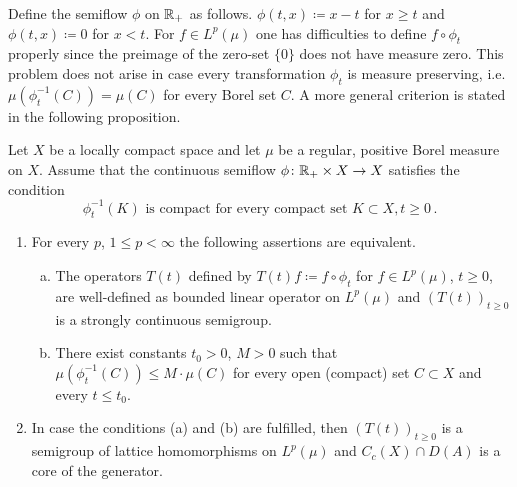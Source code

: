 Define the semiflow $\phi$ on $\mathbb{R} _+$ as follows. 
$\phi(t,x) \coloneqq  x-t$ for $x \geq t$ and $\phi(t,x) \coloneqq  0$ for $x < t$. 
For $f \in L^p(\mu)$ one has difficulties to define $f \circ \phi_t$ properly since the preimage of the zero-set $\{0\}$ does
not have measure zero. This problem does not arise in case every
transformation $\phi_t$ is measure preserving, i.e. $\mu(\phi_t^{-1}(C)) = \mu(C)$
for every Borel set $C$. A more general criterion is stated in the
following proposition.

\begin{proposition}\label{prop:c3-4.11}
Let $X$ be a locally compact space and let $\mu$ be a
regular, positive Borel measure on $X$. Assume that the continuous
semiflow $\phi \colon \mathbb{R} _+ \times X \to X$ satisfies the condition
\begin{equation}\label{eq:c3-4.12}
	\phi_t^{-1}(K)  \text{ is compact for every compact set }  K \subset X , t \geq 0\,.
\end{equation}
\begin{enumerate}[\upshape (i)]
\item		
For every $p$, $1 \leq p < \infty$ the following assertions are equivalent.

\begin{enumerate} [(a)]
\item
The operators $T(t)$ defined by $T(t)f \coloneqq  f \circ \phi_t$ for $f \in L^p(\mu)$, $t \geq 0$, are well-defined as bounded linear operator on $L^p(\mu)$ and $(T(t))_{t \geq 0}$ is a strongly continuous semigroup.
			
\item 
There exist constants $t_0 > 0$, $M > 0$ such that $\mu(\phi_t^{-1}(C)) \leq M \cdot \mu(C)$ for every open (compact) set $C \subset X$ and every $t \leq t_0$.
\end{enumerate}
	
\item 
In case the conditions (a) and (b) are fulfilled, then $(T(t))_{t \geq 0}$ is a semigroup of lattice homomorphisms on $L^p(\mu)$ and $C_c(X) \cap D(A)$ is a core of the generator.
\end{enumerate}
\end{proposition}

